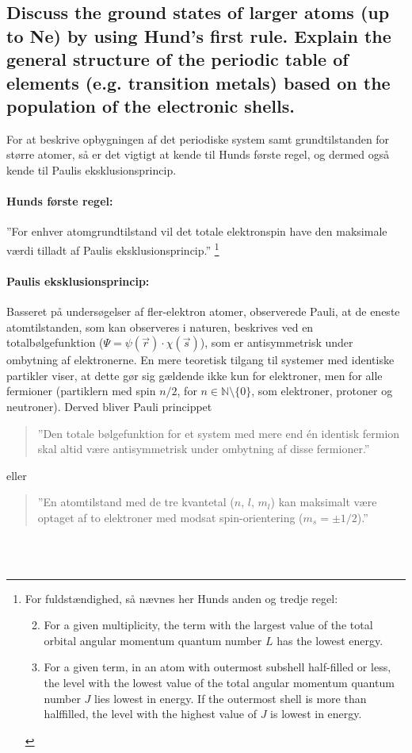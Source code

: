 \subsection{Discuss the ground states of larger atoms (up to Ne) by using Hund's first rule. Explain the general structure of the periodic table of elements (e.g. transition metals) based on the population of the electronic shells.}


For at beskrive opbygningen af det periodiske system samt grundtilstanden for større atomer, så er det vigtigt at kende til Hunds første regel, og dermed også kende til Paulis eksklusionsprincip.

\paragraph{Hunds første regel:} ''For enhver atomgrundtilstand vil det totale elektronspin have den maksimale værdi tilladt af Paulis eksklusionsprincip.'' \footnote{For fuldstændighed, så nævnes her Hunds anden og tredje regel:
\begin{enumerate}
    \setcounter{enumi}{1}
    \item For a given multiplicity, the term with the largest value of the total orbital angular momentum quantum number $L$ has the lowest energy.
    \item For a given term, in an atom with outermost subshell half-filled or less, the level with the lowest value of the total angular momentum quantum number $J$ lies lowest in energy. If the outermost shell is more than halffilled, the level with the highest value of $J$ is lowest in energy.
\end{enumerate}
}

\paragraph{Paulis eksklusionsprincip:} Basseret på undersøgelser af fler-elektron atomer, observerede Pauli, at de eneste atomtilstanden, som kan observeres i naturen, beskrives ved en totalbølgefunktion ($\Psi = \psi(\Vec{r})\cdot\chi(\Vec{s})$), som er antisymmetrisk under ombytning af elektronerne. En mere teoretisk tilgang til systemer med identiske partikler viser, at dette gør sig gældende ikke kun for elektroner, men for alle fermioner (partiklern med spin $n/2$, for $n\in\mathbb{N}\setminus\{0\}$, som elektroner, protoner og neutroner). Derved bliver Pauli princippet
\begin{quote}
    ''Den totale bølgefunktion for et system med mere end én identisk fermion skal altid være antisymmetrisk under ombytning af disse fermioner.''
\end{quote}
eller
\begin{quote}
    ''En atomtilstand med de tre kvantetal ($n$, $l$, $m_l$) kan maksimalt være optaget af to elektroner med modsat spin-orientering ($m_s = \pm 1/2$).''
\end{quote}
$ $\\\\


